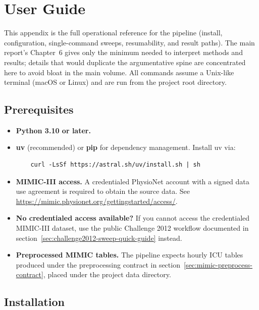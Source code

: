 \chapter{User Guide}

This appendix is the full operational reference for the pipeline (install, configuration, single-command sweeps, resumability, and result paths). The main report's Chapter~6 gives only the minimum needed to interpret methods and results; details that would duplicate the argumentative spine are concentrated here to avoid bloat in the main volume.
All commands assume a Unix-like terminal (macOS or Linux) and are run from the project root directory.

\section{Prerequisites}

\begin{itemize}\tightlist
    \item \textbf{Python 3.10 or later.}
    \item \textbf{uv} (recommended) or \textbf{pip} for dependency management. Install uv via:
    \begin{verbatim}
    curl -LsSf https://astral.sh/uv/install.sh | sh
    \end{verbatim}
    \item \textbf{MIMIC-III access.} A credentialed PhysioNet account with a signed data use agreement is required to obtain the source data. See \url{https://mimic.physionet.org/gettingstarted/access/}.
    \item \textbf{No credentialed access available?} If you cannot access the credentialed MIMIC-III dataset, use the public Challenge 2012 workflow documented in section~\ref{sec:challenge2012-sweep-quick-guide} instead.
    \item \textbf{Preprocessed MIMIC tables.} The pipeline expects hourly ICU tables produced under the preprocessing contract in section~\ref{sec:mimic-preprocess-contract}, placed under the project data directory.
\end{itemize}

\section{Installation}

